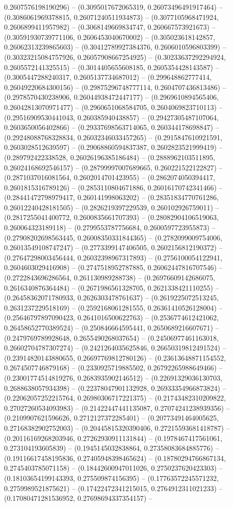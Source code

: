 0.2607576198190296) -- (0.3095017672065319, 0.26073496491917464) -- (0.3086061969378815, 0.26071240511934873) -- (0.3077105968471924, 0.2606899411957982) -- (0.3068149669834747, 0.260667573921673) -- (0.30591930739771106, 0.2606453040670002) -- (0.305023618142857, 0.26062313239865603) -- (0.30412789927384376, 0.2606010596803399) -- (0.30323215084757926, 0.26057908667254925) -- (0.30233637292294924, 0.2605572141325515) -- (0.3014405655608185, 0.2605354428143587) -- (0.3005447288240317, 0.2605137734687012) -- (0.299648862777414, 0.26049220684300156) -- (0.29875296748777114, 0.2604707436813486) -- (0.2978570430238906, 0.26044938472447177) -- (0.2969610894565406, 0.26042813070971477) -- (0.2960651068584705, 0.2604069823710113) -- (0.29516909530441043, 0.260385940438857) -- (0.29427305487107064, 0.2603650056402866) -- (0.29337698563714065, 0.260344178698847) -- (0.29248088768328834, 0.26032346033457265) -- (0.2915847610921591, 0.2603028512639597) -- (0.29068860594837387, 0.2602823521999419) -- (0.289792422338528, 0.26026196385186484) -- (0.2888962103511895, 0.26024168692546157) -- (0.28799997007689665, 0.260221522122827) -- (0.2871037016081564, 0.2602014701423955) -- (0.2862074050394417, 0.2601815316789126) -- (0.2853110804671886, 0.26016170742341466) -- (0.28441472798979417, 0.260141998063202) -- (0.28351834770761286, 0.26012240428181505) -- (0.2826219397229539, 0.260102926759011) -- (0.2817255041400772, 0.2600835661707393) -- (0.28082904106519063, 0.260064323189118) -- (0.2799553787756684, 0.2600597723955873) -- (0.27908202698563445, 0.26008350331844365) -- (0.2782099009754006, 0.26013549108747247) -- (0.2773399147406505, 0.2602156812190372) -- (0.27647298003456444, 0.26032398967317893) -- (0.2756100054122941, 0.2604603029416908) -- (0.2747518952787885, 0.26062447816707546) -- (0.2722843696286564, 0.261130989288738) -- (0.26976609142686075, 0.2616340876364484) -- (0.2671986561328705, 0.2621338421110255) -- (0.26458362071780933, 0.2626303478761637) -- (0.2619225072513245, 0.2631237229518169) -- (0.2592168061281555, 0.26361410526128004) -- (0.25646797897090423, 0.2641016500622763) -- (0.2536774612421062, 0.26458652770389524) -- (0.250846664595441, 0.2650689216607671) -- (0.2479769789928648, 0.2655490268037654) -- (0.24506977461163018, 0.26602704787307274) -- (0.2421264035625846, 0.26650319812491524) -- (0.23914820143880655, 0.26697769812780126) -- (0.23613648871154552, 0.2674507746879168) -- (0.2330925719885502, 0.26792265988649466) -- (0.23001774514819276, 0.2683935902146512) -- (0.22691329036130703, 0.2688638057934398) -- (0.22378047901132928, 0.26933354966873824) -- (0.22062057252215764, 0.26980306717221375) -- (0.21743482310209822, 0.27027260534093983) -- (0.21422447441135087, 0.27074241238939356) -- (0.2109907621596626, 0.2712127372285401) -- (0.20773491464005625, 0.27168382902752003) -- (0.20445815320390406, 0.27215593681418787) -- (0.20116169268203946, 0.27262930911131844) -- (0.1978467417561061, 0.273104193605839) -- (0.1945145032838864, 0.27358083684885776) -- (0.19116617458195836, 0.27405948398465624) -- (0.18780294766867134, 0.2745403785071158) -- (0.18442600947011026, 0.2750237620423303) -- (0.18103654199143393, 0.275509874156395) -- (0.17763572245571232, 0.2759989521875621) -- (0.17422472341215015, 0.2764912311021233) -- (0.17080471281536952, 0.27698694337354157) -- 